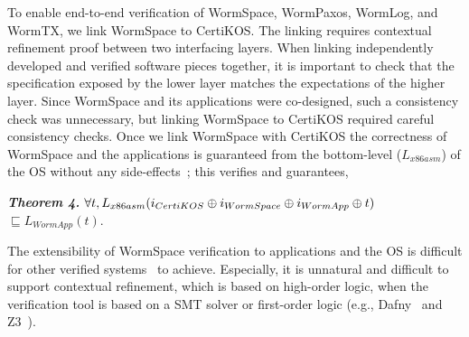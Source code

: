 To enable end-to-end verification of WormSpace, WormPaxos, WormLog, and WormTX, we link WormSpace to CertiKOS. The linking requires contextual refinement proof between two interfacing layers.
When linking independently developed and verified software pieces together, it is important to check that the specification exposed by the lower layer matches the expectations of the higher layer. Since WormSpace and its applications were co-designed, such a consistency check was unnecessary, but linking WormSpace to CertiKOS required careful consistency checks. Once we link WormSpace with CertiKOS the correctness of WormSpace and the applications is guaranteed from the bottom-level ($L_{x86asm}$) of the OS without any side-effects~\cite{shimlayer}; this verifies and guarantees,

\noindent\textit{\textbf{Theorem 4.} $\forall t, L_{x86asm} (i_{CertiKOS} \oplus i_{WormSpace} \oplus i_{WormApp} \oplus t) \\
\null$\qquad\qquad\quad\quad$ \sqsubseteq L_{WormApp} (t)$}. 

The extensibility of WormSpace verification to applications and the OS is difficult for other verified systems~\cite{ironfleet, hyperkernel} to achieve. Especially, it is unnatural and difficult to support contextual refinement, which is based on high-order logic, when the verification tool is based on a SMT solver or first-order logic (e.g., Dafny~\cite{dafny} and Z3~\cite{z3}). 


